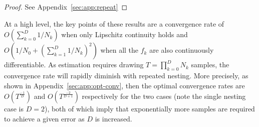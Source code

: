 \begin{proof}
	See Appendix~\ref{sec:app:repeat}
\end{proof}
At a high level, the key points of these results are a convergence rate of $O(\sum_{k=0}^{D} 1/N_k)$
when only Lipschitz continuity holds and $O(1/N_0 +(\sum_{k=1}^{D} 1/N_k)^2)$ when
all the $f_k$ are also continuously differentiable.  
As estimation requires drawing $T = \prod_{k=0}^{D} N_k$ samples, 
the convergence rate will rapidly diminish with repeated nesting.  More precisely,
as shown in Appendix~\ref{sec:app:opt-conv}, then the optimal convergence rates are
$O(T^{\frac{-1}{D}})$ and $O(T^{\frac{-2}{D+1}})$ respectively for the two cases (note the single nesting case 
is $D=2$), both of which
imply that exponentially more samples are required to achieve a given error as $D$ is increased.
